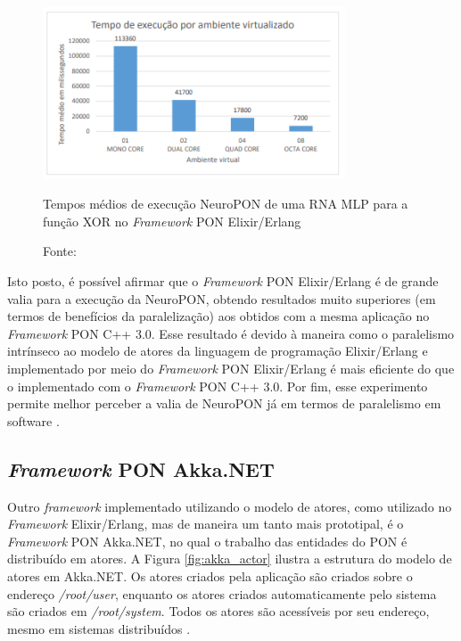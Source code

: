 \begin{figure}[!htb]
  \centering
  \includegraphics[width=0.8\textwidth]{../figures/neuropon_elixir.png}
  \smallskip
  \caption{Tempos médios de execução NeuroPON de uma RNA MLP para a função XOR
  no \textit{Framework} PON Elixir/Erlang} \caption*{Fonte:
  }
  \label{fig:neuropon_elixir}
\end{figure}

Isto posto, é possível afirmar que o \textit{Framework} PON Elixir/Erlang é de
grande valia para a execução da NeuroPON, obtendo resultados muito superiores
(em termos de benefícios da paralelização) aos obtidos com a mesma aplicação no
\textit{Framework} PON C++ 3.0. Esse resultado é devido à maneira como o
paralelismo intrínseco ao modelo de atores da linguagem de programação
Elixir/Erlang e implementado por meio do \textit{Framework} PON Elixir/Erlang é
mais eficiente do que o implementado com o \textit{Framework} PON C++ 3.0. Por
fim, esse experimento permite melhor perceber a valia de NeuroPON já em termos
de paralelismo em software \cite{doc_Schutz_2019}.

\subsection{\textit{Framework} PON Akka.NET}\label{sec:akka}

Outro \textit{framework} implementado utilizando o modelo de atores, como
utilizado no \textit{Framework} Elixir/Erlang, mas de maneira um tanto mais
prototipal, é o \textit{Framework} PON Akka.NET, no qual o trabalho das
entidades do PON é distribuído em atores. A Figura \ref{fig:akka_actor} ilustra
a estrutura do modelo de atores em Akka.NET. Os atores criados pela aplicação
são criados sobre o endereço \textit{/root/user}, enquanto os atores criados
automaticamente pelo sistema são criados em \textit{/root/system}. Todos os
atores são acessíveis por seu endereço, mesmo em sistemas distribuídos
\cite{martini_2019}.

